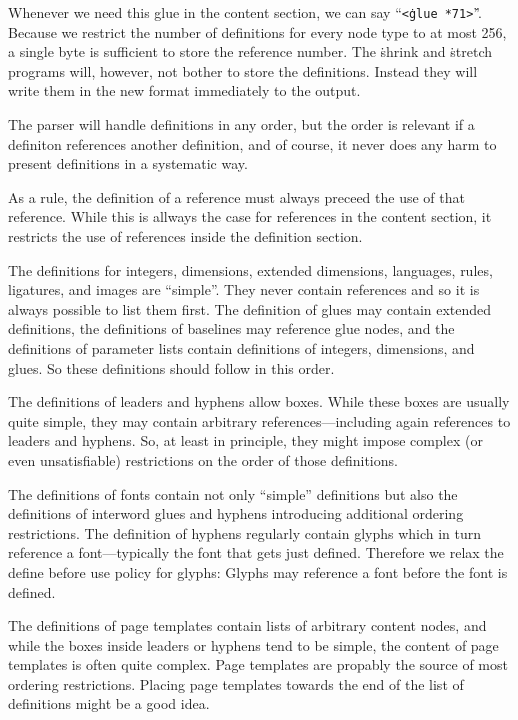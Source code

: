 Whenever we need this glue in the content section, we can say
``{\tt \.{<}glue *71\.{>}}''.  Because we restrict the number of definitions
for every node type to at most 256, a single byte is sufficient to
store the reference number.  The \.{shrink} and \.{stretch} programs
will, however, not bother to store the definitions. Instead they will
write them in the new format immediately to the output.

The parser will handle definitions in any order, but the order is relevant
if a definiton references another definition, and of course,
it never does any harm to present definitions in a systematic way.

As a rule, the definition of a reference must always preceed the
use of that reference. While this is allways the case for
references in the content section, it restricts the use of
references inside the definition section.

The definitions for integers, dimensions, extended dimensions,
languages, rules, ligatures, and images are ``simple''.
They never contain references and so it is always possible to list them first.
The definition of glues may contain extended definitions,
the definitions of baselines may reference glue nodes, and
the definitions of parameter lists contain definitions of integers, dimensions,
and glues. So these definitions should follow in this order.

The definitions of leaders and hyphens allow boxes.
While these boxes are usually
quite simple, they may contain arbitrary references---including again
references to leaders and hyphens.  So, at least in principle,
they might impose complex (or even unsatisfiable) restrictions
on the order of those definitions.

The definitions of fonts contain not only ``simple'' definitions
but also the definitions of interword glues and hyphens
introducing additional ordering restrictions.
The definition of hyphens regularly contain glyphs which in turn reference
a font---typically the font that gets just defined.
Therefore we relax the define before use policy for glyphs:
Glyphs may reference a font before the font is defined.

The definitions of page templates contain lists of arbitrary content
nodes, and while the boxes inside leaders or hyphens tend to be simple,
the content of page templates is often quite complex.
Page templates are propably the source of most ordering restrictions.
Placing page templates towards the end of the list of definitions
might be a good idea.

